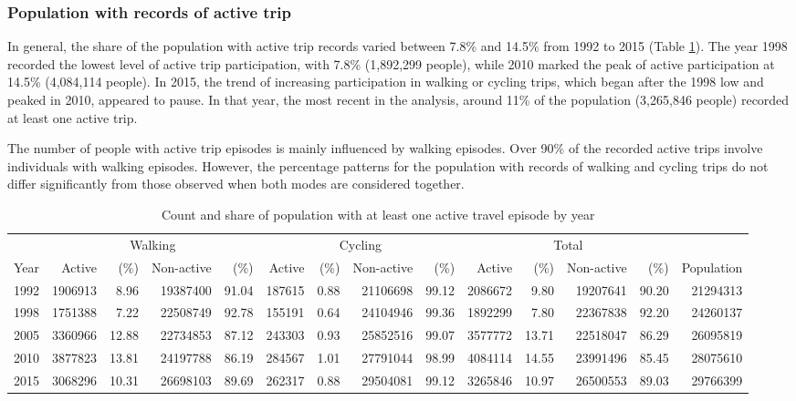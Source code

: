 \documentclass[preprint, 3p,
authoryear]{elsarticle} %
\begin{document}
\subsubsection{Population with records of active
trip}\label{population-with-records-of-active-trip}

In general, the share of the population with active trip records varied
between 7.8\% and 14.5\% from 1992 to 2015 (Table
\ref{tab:active-pop-proportion-table}). The year 1998 recorded the
lowest level of active trip participation, with 7.8\% (1,892,299
people), while 2010 marked the peak of active participation at 14.5\%
(4,084,114 people). In 2015, the trend of increasing participation in
walking or cycling trips, which began after the 1998 low and peaked in
2010, appeared to pause. In that year, the most recent in the analysis,
around 11\% of the population (3,265,846 people) recorded at least one
active trip.

The number of people with active trip episodes is mainly influenced by
walking episodes. Over 90\% of the recorded active trips involve
individuals with walking episodes. However, the percentage patterns for
the population with records of walking and cycling trips do not differ
significantly from those observed when both modes are considered
together.

\begingroup\fontsize{6}{8}\selectfont

\begin{longtable}[t]{rrrrrrrrrrrrrr}
\caption{\label{tab:active_pop_proportion_table}\label{tab:active-pop-proportion-table}Count and share of population with at least one active travel episode by year}\\
\toprule
\multicolumn{1}{c}{ } & \multicolumn{4}{c}{Walking} & \multicolumn{4}{c}{Cycling} & \multicolumn{4}{c}{Total} \\
\cmidrule(l{3pt}r{3pt}){2-5} \cmidrule(l{3pt}r{3pt}){6-9} \cmidrule(l{3pt}r{3pt}){10-13}
Year & Active & (\%) & Non-active & (\%) & Active & (\%) & Non-active & (\%) & Active & (\%) & Non-active & (\%) & Population\\
\midrule
1992 & 1906913 & 8.96 & 19387400 & 91.04 & 187615 & 0.88 & 21106698 & 99.12 & 2086672 & 9.80 & 19207641 & 90.20 & 21294313\\
1998 & 1751388 & 7.22 & 22508749 & 92.78 & 155191 & 0.64 & 24104946 & 99.36 & 1892299 & 7.80 & 22367838 & 92.20 & 24260137\\
2005 & 3360966 & 12.88 & 22734853 & 87.12 & 243303 & 0.93 & 25852516 & 99.07 & 3577772 & 13.71 & 22518047 & 86.29 & 26095819\\
2010 & 3877823 & 13.81 & 24197788 & 86.19 & 284567 & 1.01 & 27791044 & 98.99 & 4084114 & 14.55 & 23991496 & 85.45 & 28075610\\
2015 & 3068296 & 10.31 & 26698103 & 89.69 & 262317 & 0.88 & 29504081 & 99.12 & 3265846 & 10.97 & 26500553 & 89.03 & 29766399\\
\bottomrule
\end{longtable}
\endgroup{}
\end{document}
